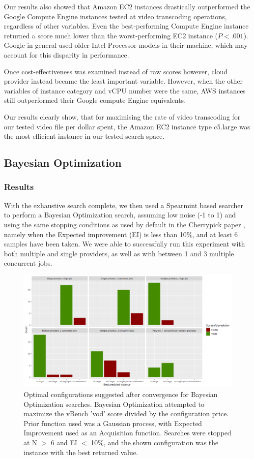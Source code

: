 \documentclass{report}
\begin{document}
Our results also showed that Amazon EC2 instances drastically outperformed the Google Compute Engine instances tested at video transcoding operations, regardless of other variables. Even the best-performing Compute Engine instance returned a score much lower than the worst-performing EC2 instance ($P < .001$). Google in general used older Intel Processor models in their machine, which may account for this disparity in performance.

Once cost-effectiveness was examined instead of raw scores however, cloud provider instead became the least important variable. However, when the other variables of instance category and vCPU number were the same, AWS instances still outperformed their Google compute Engine equivalents.

Our results clearly show, that for maximising the rate of video transcoding for our tested video file per dollar spent, the Amazon EC2 instance type c5.large was the most efficient instance in our tested search space. 
\subsection{Bayesian Optimization}
\subsubsection{Results}
With the exhaustive search complete, we then used a Spearmint based searcher to perform a Bayesian Optimization search, assuming low noise (-1 to 1) and using the same stopping conditions as used by default in the Cherrypick paper \cite{Alipourfard2017}, namely when the Expected improvement (EI) is less than 10\%, and at least 6 samples have been taken. We were able to successfully run this experiment with both multiple and single providers, as well as with between 1 and 3 multiple concurrent jobs.

\begin{figure}
  \caption{Optimal configurations suggested after convergence for Bayesian Optimization searches. Bayesian Optimization attempted to maximize the vBench 'vod' score divided by the configuration price. Prior function used was a Gaussian process, with Expected Improvement used as an Acquisition function. Searches were stopped at N $>$ 6 and EI $<$ 10\%, and the shown configuration was the instance with the best returned value.}
  \label{fig:bo-results}
  \centering
  \includegraphics[scale=0.5]{bo_results}
\end{figure}
\end{document}
